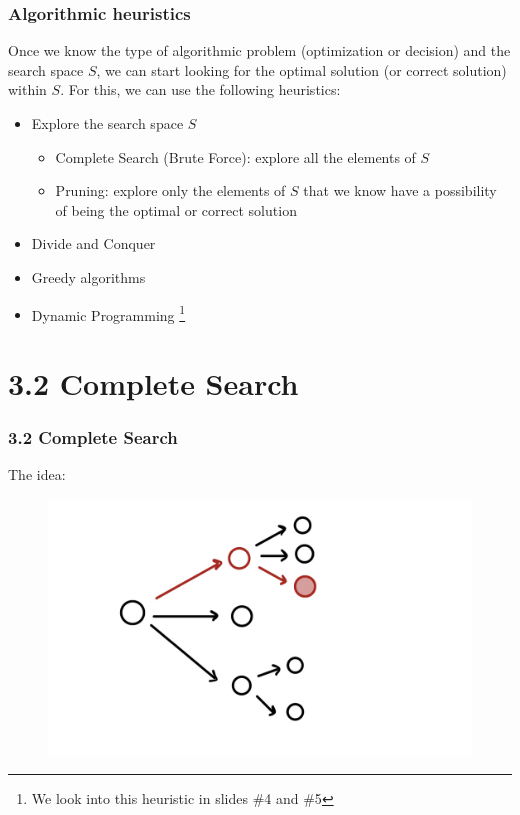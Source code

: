 \documentclass{beamer}
\begin{document}
\begin{frame}[fragile]
\frametitle{Algorithmic heuristics}

Once we know the type of algorithmic problem (optimization or decision) and the search space $S$, we can start looking for the optimal solution (or correct solution) within $S$. For this, we can use the following heuristics:

\vspace{0.3cm}

\begin{itemize}
    \item Explore the search space $S$
    	\begin{itemize}
		    \item \color{blue}Complete Search (Brute Force)\color{black}: explore all the elements of $S$
		    \item Pruning: explore only the elements of $S$ that we know have a possibility of being the optimal or correct solution 
		\end{itemize}
    \item Divide and Conquer
    \item Greedy algorithms
    \item Dynamic Programming \footnote{We look into this heuristic in slides \#4 and \#5}
\end{itemize}

\end{frame}


\section{3.2 Complete Search}

\begin{frame}[fragile]
\frametitle{3.2 Complete Search}
The idea: 

\begin{figure}
    \centering
    \includegraphics[scale=0.2]{imgs/complete_search.png}
\end{figure}

\end{frame}
\end{document}

